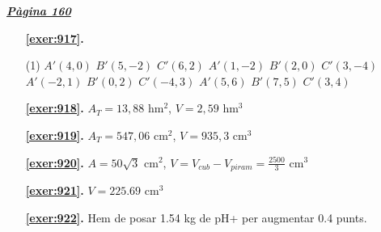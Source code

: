 \hyperlink{page.160}{\textbf{\em Pàgina 160}}
\begin{enumerate}



 \item[\fontfamily{phv}\selectfont\color{blue}\textbf{\ref{exer:917}. }] \label{ans:917}
 \begin{tasks}[column-sep=1em, item-indent=1.3333em](1)
	 \task $A'(4,0)$ $B'(5,-2)$ $C'(6,2)$
	 \task* $A'(1,-2)$ $B'(2,0)$ $C'(3,-4)$
	 \task* $A'(-2,1)$ $B'(0,2)$ $C'(-4,3)$
	 \task $A'(5,6)$ $B'(7,5)$ $C'(3,4)$
\end{tasks}
 \end{enumerate}
\begin{enumerate}
\item[\fontfamily{phv}\selectfont\color{blue}\textbf{\ref{exer:918}. }] \label{ans:918} 
$A_T =13,88$ hm$^{2}$, $V=2,59$ hm$^3$
\item[\fontfamily{phv}\selectfont\color{blue}\textbf{\ref{exer:919}. }] \label{ans:919} 
$A_T =547,06$ cm$^{2}$, $V=935,3$ cm$^3$
\item[\fontfamily{phv}\selectfont\color{blue}\textbf{\ref{exer:920}. }] \label{ans:920} 
$A=50\sqrt {3}$ cm$^{2}$, $V=V_{cub} -V_{piram}=\frac {2500}{3}$ cm$^{3}$
\item[\fontfamily{phv}\selectfont\color{blue}\textbf{\ref{exer:921}. }] \label{ans:921} 
$V=225.69$ cm$^3$
\item[\fontfamily{phv}\selectfont\color{blue}\textbf{\ref{exer:922}. }] \label{ans:922} 
Hem de posar 1.54 kg de pH+ per augmentar 0.4 punts.
 \end{enumerate}